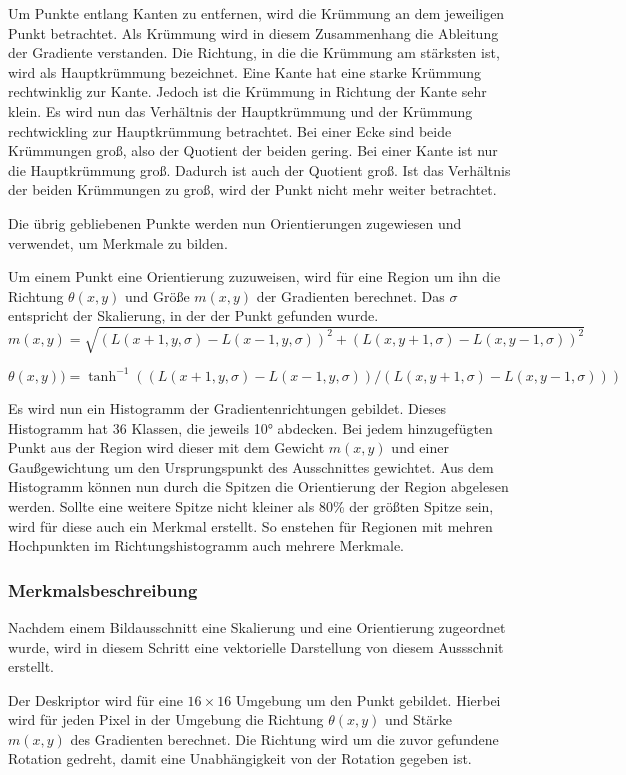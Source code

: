 Um Punkte entlang Kanten zu entfernen, wird die Krümmung an dem jeweiligen Punkt betrachtet. Als Krümmung wird in diesem Zusammenhang die Ableitung der Gradiente verstanden. Die Richtung, in die die Krümmung am stärksten ist, wird als Hauptkrümmung bezeichnet.
Eine Kante hat eine starke Krümmung rechtwinklig zur Kante. Jedoch ist die Krümmung in Richtung der Kante sehr klein. 
Es wird nun das Verhältnis der Hauptkrümmung und der Krümmung rechtwickling zur Hauptkrümmung betrachtet.
Bei einer Ecke sind beide Krümmungen groß, also der Quotient der beiden gering. Bei einer Kante ist nur die Hauptkrümmung groß. Dadurch ist auch der Quotient groß. 
Ist das Verhältnis der beiden Krümmungen zu groß, wird der Punkt nicht mehr weiter betrachtet.


Die übrig gebliebenen Punkte werden nun Orientierungen zugewiesen und verwendet, um Merkmale zu bilden.


Um einem Punkt eine Orientierung zuzuweisen, wird für eine Region um ihn die Richtung $\theta(x, y)$ und Größe $m(x, y)$ der Gradienten berechnet. Das $\sigma$ entspricht der Skalierung, in der der Punkt gefunden wurde.
\[
m(x, y) = \sqrt{(L(x + 1, y, \sigma) - L(x - 1, y, \sigma))^2 + (L(x, y + 1, \sigma) - L(x, y - 1, \sigma))^2}
\]

\[
\theta(x, y)) = \tanh^{-1}((L(x + 1, y, \sigma) - L(x - 1, y, \sigma)) / (L(x, y + 1, \sigma) - L(x, y - 1, \sigma)))
\]

Es wird nun ein Histogramm der Gradientenrichtungen gebildet. Dieses Histogramm hat 36 Klassen, die jeweils 10° abdecken. Bei jedem hinzugefügten Punkt aus der Region wird dieser mit dem Gewicht $m(x, y)$ und einer Gaußgewichtung um den Ursprungspunkt des Ausschnittes gewichtet.
Aus dem Histogramm können nun durch die Spitzen die Orientierung der Region abgelesen werden. Sollte eine weitere Spitze nicht kleiner als 80\% der größten Spitze sein, wird für diese auch ein Merkmal erstellt. So enstehen für Regionen mit mehren Hochpunkten im Richtungshistogramm auch mehrere Merkmale.

\subsubsection{Merkmalsbeschreibung}

Nachdem einem Bildausschnitt eine Skalierung und eine Orientierung zugeordnet wurde, wird in diesem Schritt eine vektorielle Darstellung von diesem Aussschnit erstellt.


Der Deskriptor wird für eine $16 \times 16$ Umgebung um den Punkt gebildet. Hierbei wird für jeden Pixel in der Umgebung die Richtung $\theta(x, y)$ und Stärke $m(x, y)$ des Gradienten berechnet. Die Richtung wird um die zuvor gefundene Rotation gedreht, damit eine Unabhängigkeit von der Rotation gegeben ist.

